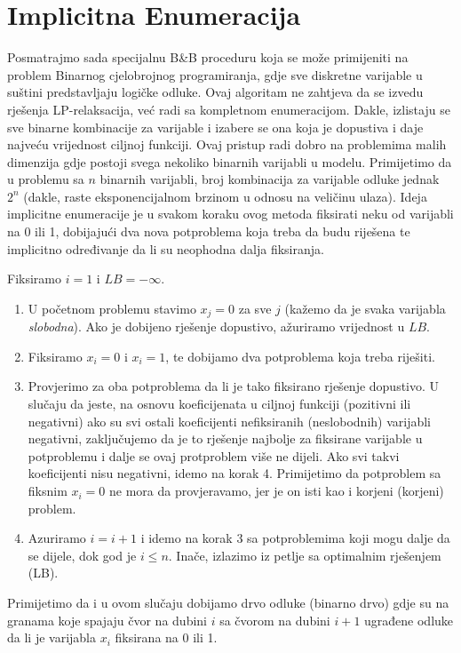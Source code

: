 \documentclass[a4paper, utf8, 11pt, colorlinks]{book}
\begin{document}
\section{Implicitna Enumeracija}
Posmatrajmo sada specijalnu B\&B proceduru koja se može primijeniti na problem Binarnog cjelobrojnog programiranja, gdje   sve diskretne varijable u suštini predstavljaju logičke odluke. Ovaj algoritam ne zahtjeva da se izvedu rješenja LP-relaksacija, već radi sa kompletnom enumeracijom. Dakle, izlistaju se sve binarne kombinacije za varijable i izabere se ona koja je dopustiva i daje najveću vrijednost ciljnoj funkciji. Ovaj pristup radi dobro na problemima malih dimenzija gdje postoji svega nekoliko binarnih varijabli u modelu. Primijetimo da u problemu sa $n$ binarnih varijabli,  broj kombinacija za varijable odluke jednak $2^n$ (dakle, raste eksponencijalnom brzinom u odnosu na veličinu ulaza). Ideja implicitne enumeracije je u svakom koraku ovog metoda fiksirati neku od varijabli na 0 ili 1, dobijajući dva nova potproblema koja treba da budu riješena te implicitno određivanje da li su neophodna dalja fiksiranja.  

Fiksiramo $i=1$ i $LB=-\infty$. 

\begin{enumerate}
    \item U početnom problemu  stavimo $x_j=0$ za sve $j$ (kažemo da je svaka varijabla \emph{slobodna}). Ako je dobijeno rješenje dopustivo, ažuriramo vrijednost u $LB$.
    \item Fiksiramo $x_i=0$  i $x_i=1$, te dobijamo dva potproblema koja treba riješiti.
    \item  Provjerimo za oba potproblema da li je tako fiksirano rješenje dopustivo. U slučaju da jeste, na osnovu koeficijenata u ciljnoj funkciji (pozitivni ili negativni) ako su svi  ostali koeficijenti nefiksiranih (neslobodnih) varijabli negativni, zaključujemo da je to rješenje najbolje za fiksirane varijable u potproblemu i dalje se ovaj protproblem više ne dijeli. Ako svi takvi koeficijenti nisu negativni, idemo na korak 4. Primijetimo da  potproblem sa fiksnim $x_i=0$ ne mora da provjeravamo, jer je on isti kao i korjeni (korjeni) problem.
    \item Azuriramo $i = i+1$ i idemo na korak 3 sa potproblemima koji mogu dalje da se dijele, dok god je $i \leq n$. Inače, izlazimo iz petlje sa optimalnim rješenjem (LB). 
\end{enumerate}
 Primijetimo da i u ovom slučaju dobijamo drvo odluke (binarno drvo) gdje su na granama koje spajaju čvor na dubini $i$ sa čvorom na dubini $i+1$  ugrađene odluke da li je varijabla $x_i$ fiksirana na 0 ili 1.
\end{document}
